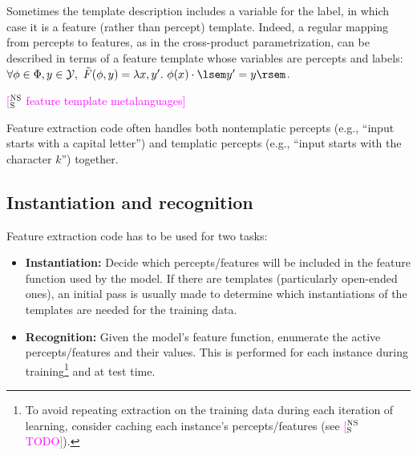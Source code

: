 \documentclass[11pt,letterpaper]{article}
\newcommand{\ensuretext}[1]{#1}
\newcommand{\nssmarker}{\ensuretext{\textcolor{magenta}{\ensuremath{^{\textsc{NS}}_{\textsc{S}}}}}}
\newcommand{\arkcomment}[3]{\ensuretext{\textcolor{#3}{[#1 #2]}}}
\newcommand{\nss}[1]{\arkcomment{\nssmarker}{#1}{magenta}}
\begin{document}
Sometimes the template description includes a variable for the label, 
in which case it is a feature (rather than percept) template.
Indeed, a regular mapping from percepts to features, 
as in the cross-product parametrization, can be described in terms of a feature template 
whose variables are percepts and labels: 
$\forall \phi\in\Phi, y\in\mathcal{Y},\ \tilde{F}(\phi,y) = \lambda x,y'.\ \phi(x) \cdot \lsem y'=y \rsem$.

\nss{feature template metalanguages}

Feature extraction code often handles both nontemplatic percepts (e.g., ``input starts with a capital letter'') 
and templatic percepts (e.g., ``input starts with the character $k$'') together.

\subsection{Instantiation and recognition}\label{sec:inst}

Feature extraction code has to be used for two tasks:
\begin{itemize}
  \item \textbf{Instantiation:} 
  Decide which percepts\slash features will be included in the feature function used by the model. 
  If there are templates (particularly open-ended ones), an initial pass is usually made 
  to determine which instantiations of the templates are needed for the training data.
  \item \textbf{Recognition:} 
  Given the model's feature function, enumerate the active percepts\slash features and their values.
  This is performed for each instance during training\footnote{To avoid repeating extraction on the training data 
during each iteration of learning, consider caching each instance's percepts\slash features (see \nss{TODO}).} and at test time.
\end{itemize}
\end{document}
